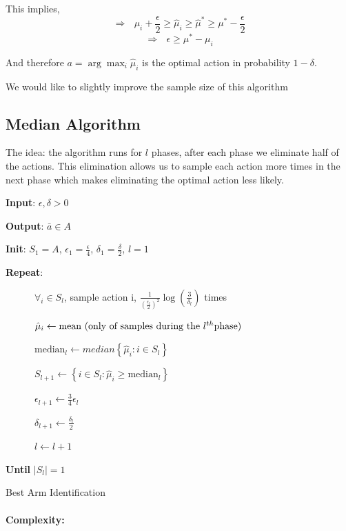 This implies,
\[
\Rightarrow\text{ }\mu_{i}+\frac{\epsilon}{2}\ge\hat{\mu}_{i}\ge\hat{\mu}^{*}\ge\mu^{*}-\frac{\epsilon}{2}
\]
\[
\Rightarrow\text{ }\epsilon\ge\mu^{*}-\mu_{i}
\]

And therefore $a={\displaystyle \arg\max_{i}\hat{\mu}_{i}}$ is the
optimal action in probability $1-\delta$.

We would like to slightly improve the sample size of this algorithm

\subsection{Median Algorithm}

The idea: the algorithm runs for $l$ phases, after each phase we
eliminate half of the actions. This elimination allows us to sample
each action more times in the next phase which makes eliminating the
optimal action less likely.

\begin{algorithm}
\textbf{Input}: $\epsilon,\delta>0$

\textbf{Output}: $\bar{a}\in A$

\textbf{Init}: $S_{1}=A$, $\epsilon_{1}=\frac{\epsilon}{4}$,
$\delta_{1}=\frac{\delta}{2}$, $l=1$

\textbf{Repeat}:

~~~~~~$\forall_{i}\in S_{l}$, sample action i, $\frac{1}{\left(\frac{\epsilon_{l}}{2}\right)^{2}}\log\left(\frac{3}{\delta_{l}}\right)$
times

~~~~~~$\hat{\mu}_{i}\leftarrow\text{mean (only of samples during the \ensuremath{l^{th}}phase)}$

~~~~~~$\text{median}_{l}\leftarrow median\left\{ \hat{\mu}_{i}:i\in S_{l}\right\} $

~~~~~~$S_{l+1}\leftarrow\left\{ i\in S_{l}:\hat{\mu}_{i}\ge\text{median}_{l}\right\} $

~~~~~~$\epsilon_{l+1}\leftarrow\frac{3}{4}\epsilon_{l}$

~~~~~~$\delta_{l+1}\leftarrow\frac{\delta_{l}}{2}$

~~~~~~$l\leftarrow l+1$

\textbf{Until} $\left|S_{l}\right|=1$

\caption{Best Arm Identification}
\end{algorithm}

\paragraph{Complexity:}


